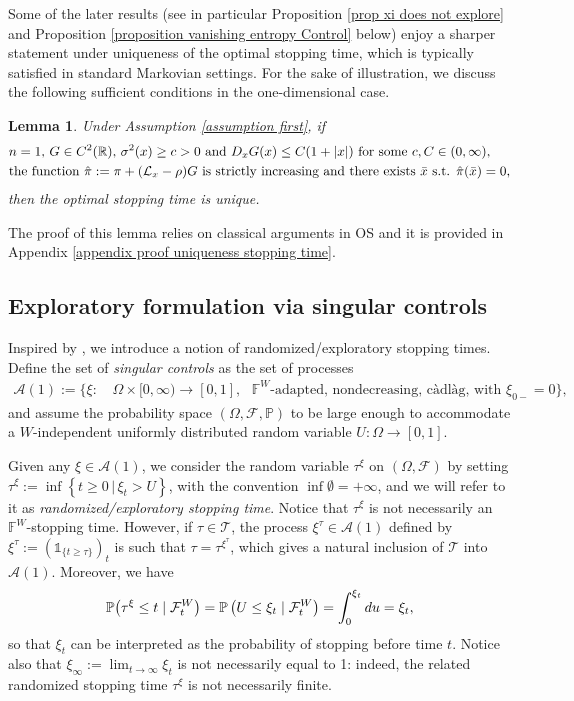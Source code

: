\documentclass[11pt]{amsart}
\newtheorem{lemma}[theorem]{Lemma}
\theoremstyle{plain}
\def \dd{{\rm d}}
\def \R{\mathbb{R}}
\def \P{\mathbb{P}}
\def \F{\mathbb{F}}
\def \cF{{\mathcal F}}
\def \A{\mathcal{A}}
\numberwithin{equation}{section}
\begin{document}
Some of the later results (see in particular Proposition \ref{prop xi does not explore} and Proposition \ref{proposition vanishing entropy Control} below) enjoy a sharper statement under uniqueness of the optimal stopping time, which is typically satisfied in standard Markovian settings.
For the sake of illustration, we discuss the following sufficient conditions in the one-dimensional case.
\begin{lemma}\label{lemma uniqueness stopping time}
Under Assumption \ref{assumption first}, if
\begin{equation} 
    \label{condition for UNIQUENESS}
    \begin{aligned}
        &\text{$n=1$, $G \in C^2(\R)$, $\sigma^2(x) \geq  c>0$ and $D_x G(x) \leq C (1 + |x|)$ for some $c,C\in (0,\infty)$,} \\
        & \text{the function $ \hat \pi := \pi + (\mathcal L_x -\rho) G$ is strictly increasing and there exists $\bar x $ s.t. $\hat \pi (\bar x)=0$,}
    \end{aligned}
\end{equation}
then the optimal stopping time is unique.
\end{lemma}
The proof of this lemma relies on classical arguments in OS and it is provided in Appendix \ref{appendix proof uniqueness stopping time}.

\subsection{Exploratory formulation via singular controls}
Inspired by \cite{touzi.vieille.2002continuous}, we introduce a notion of randomized/exploratory stopping times.
Define the set of \emph{singular controls} as the set of processes
\begin{align*}
    \A (1):= \Big\{ \xi : & \, \Omega \times[0, \infty) \to [0,1], \text{ $\F ^W$-adapted, nondecreasing, càdlàg, with $\xi_{0-}=0$} \Big\}, 
\end{align*} 
and assume the probability space $(\Omega, \cF, \P)$ to be large enough to accommodate a $W$-independent uniformly distributed random variable $U:\Omega \to [0,1]$.

Given any $\xi \in \mathcal A (1)$, we consider the random variable $\tau^\xi$ on $(\Omega, \mathcal F)$ by setting $\tau^\xi:=\inf \left\{t \geq 0 \, | \, \xi_{t}>U\right\}$, with the convention $\inf \emptyset = +\infty$, and we will refer to it as \emph{randomized/exploratory stopping time}.
Notice that $\tau^\xi$ is not necessarily an $\mathbb F ^W$-stopping time.
However, if $\tau \in \mathcal T$, the process $\xi^\tau \in \mathcal A (1)$ defined by $\xi^\tau := ( \mathds 1 _{\{ t \geq \tau \} } )_t$ is such that $\tau = \tau^{\xi^\tau}$, which gives a natural inclusion of $\mathcal T$ into $\mathcal A (1)$.
Moreover, we have
$$
\mathbb{P} \big( \tau^\xi \leq t \mid \cF _{t}^{W}\big)
=\mathbb{P}\left( U \leq {\xi}_{t} \mid \cF _{t}^{W}\right)
=\int_{0}^{\xi_{t}} \dd u=\xi_{t}, 
$$
so that $\xi_t$ can be interpreted as the probability of stopping before time $t$.
Notice also that $\xi_\infty := \lim_{t \to \infty} \xi_t$ is not necessarily equal to 1: indeed, the related randomized stopping time $\tau^\xi$ is not necessarily finite.
\end{document}
